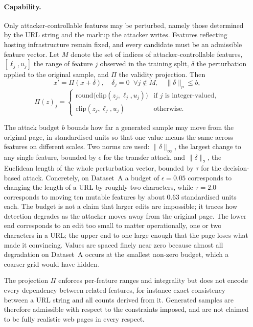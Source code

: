 \documentclass[runningheads]{llncs}
\begin{document}
\paragraph{Capability.} Only attacker-controllable features may be perturbed,
namely those determined by the URL string and the markup the attacker writes.
Features reflecting hosting infrastructure remain fixed, and every candidate must
be an admissible feature vector. Let $M$ denote the set of indices of
attacker-controllable features, $[\ell_j, u_j]$ the range of feature $j$ observed
in the training split, $\delta$ the perturbation applied to the original sample,
and $\Pi$ the validity projection. Then
\begin{equation}
x' = \Pi(x + \delta), \quad \delta_j = 0 \;\; \forall j \notin M, \quad
\|\delta\|_p \le b,
\label{eq:threat}
\end{equation}
\begin{equation}
\Pi(z)_j = \left\{
\begin{array}{ll}
\mathrm{round}\big(\mathrm{clip}(z_j, \ell_j, u_j)\big) & \mbox{if } j \mbox{ is integer-valued},\\[2pt]
\mathrm{clip}(z_j, \ell_j, u_j) & \mbox{otherwise.}
\end{array}\right.
\label{eq:proj}
\end{equation}

The attack budget $b$ bounds how far a generated sample may move from the
original page, in standardised units so that one value means the same across
features on different scales. Two norms are used: $\|\delta\|_\infty$, the
largest change to any single feature, bounded by $\epsilon$ for the transfer
attack, and $\|\delta\|_2$, the Euclidean length of the whole perturbation
vector, bounded by $\tau$ for the decision-based attack. Concretely, on
Dataset~A a budget of $\epsilon = 0.05$ corresponds to changing the length of a
URL by roughly two characters, while $\tau = 2.0$ corresponds to moving ten
mutable features by about 0.63 standardised units each.
The budget is not a claim that larger edits are impossible; it traces how
detection degrades as the attacker moves away from the original page. The lower
end corresponds to an edit too small to matter operationally, one or two characters in a URL; the upper end to one large enough that the page loses what made it
convincing. Values are spaced finely near zero because almost all degradation on
Dataset~A occurs at the smallest non-zero budget, which a coarser grid would have
hidden.

The projection $\Pi$ enforces per-feature ranges and integrality but does not
encode every dependency between related features, for instance exact consistency
between a URL string and all counts derived from it. Generated samples are
therefore admissible with respect to the constraints imposed, and are not claimed
to be fully realistic web pages in every respect.
\end{document}
